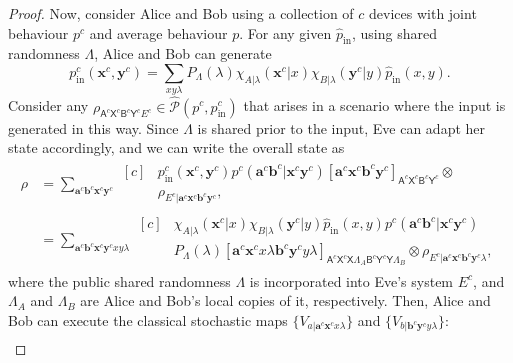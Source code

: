 \documentclass[10pt, a4paper]{article}
\numberwithin{equation}{section} %
\theoremstyle{definition}
\theoremstyle{plain}
\newcommand{\?}{\mathrel{?}} %
\newcommand{\cvec}[1]{\boldsymbol{\mathbf{#1}}}    %
\newcommand{\crv}[1]{\mathsf{#1}}
\newcommand{\proj}[2][]{{[#2]}_{#1}}
\newcommand{\compatstates}[3][]{\hat{\mathcal{P}}#1(#2,#3)}
\newcommand{\prin}[1][p]{#1_{\mathrm{in}}}
\begin{document}
\begin{proof}
                    Now, consider Alice and Bob using a collection of \(c\) devices with joint behaviour \(p^c\) and average behaviour \(p\). For any given \(\prin[\hat{p}]\), using shared randomness \(\Lambda\), Alice and Bob can generate
                    \[ \prin^c(\cvec{x}^c, \cvec{y}^c) = \sum_{xy\lambda} P_{\Lambda}(\lambda) \chi_{A|\lambda}(\cvec{x}^c|x)\chi_{B|\lambda}(\cvec{y}^c|y) \prin[\hat{p}](x,y). \]
                    Consider any \(\rho_{\crv{A}^c\crv{X}^c \crv{B}^c\crv{Y}^c E^c} \in \compatstates{p^c}{\prin^c}\) that arises in a scenario where the input is generated in this way. Since \(\Lambda\) is shared prior to the input, Eve can adapt her state accordingly, and we can write the overall state as
                    \begin{align*}
                      \rho &= \sum_{\cvec{a}^c\cvec{b}^c \cvec{x}^c\cvec{y}^c} \begin{aligned}[c]
          & \prin^c(\cvec{x}^c,\cvec{y}^c) p^c(\cvec{a}^c\cvec{b}^c|\cvec{x}^c\cvec{y}^c) \proj[\crv{A}^c\crv{X}^c \crv{B}^c\crv{Y}^c]{\cvec{a}^c\cvec{x}^c\cvec{b}^c\cvec{y}^c} \otimes \\
          & \rho_{E^c|\cvec{a}^c\cvec{x}^c \cvec{b}^c\cvec{y}^c},
                      \end{aligned} \\
                                                                       &= \sum_{\cvec{a}^c\cvec{b}^c \cvec{x}^c\cvec{y}^c xy\lambda} \begin{aligned}[c]
          & \chi_{A|\lambda}(\cvec{x}^c|x) \chi_{B|\lambda}(\cvec{y}^c|y) \prin[\hat{p}](x,y) p^c(\cvec{a}^c\cvec{b}^c|\cvec{x}^c\cvec{y}^c) \\
          & P_{\Lambda}(\lambda) \proj[\crv{A}^c\crv{X}^c\crv{X}\Lambda_A \crv{B}^c\crv{Y}^c\crv{Y}\Lambda_B]{\cvec{a}^c\cvec{x}^c{x}\lambda \cvec{b}^c\cvec{y}^c{y}\lambda} \otimes \rho_{E^c|\cvec{a}^c\cvec{x}^c \cvec{b}^c\cvec{y}^c\lambda},
                                                                       \end{aligned}
                      \end{align*}
                      where the public shared randomness \(\Lambda\) is incorporated into Eve's system \(E^c\), and \(\Lambda_A\) and \(\Lambda_B\) are Alice and Bob's local copies of it, respectively. Then, Alice and Bob can execute the classical stochastic maps \(\{V_{a|\cvec{a}^c\cvec{x}^c x\lambda}\}\) and \(\{V_{b|\cvec{b}^c\cvec{y}^c y\lambda}\}\):
                      \begin{align*}

\end{align*}
\end{proof}
\end{document}
